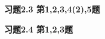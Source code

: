 \renewcommand{\newpageorvspace}{\vspace{2em}}

\date{第四次作业}



\maketitle


{\bf 习题2.3 第1,2,3,4(2),5题}

{\bf 习题2.4 第1,2,3题}



